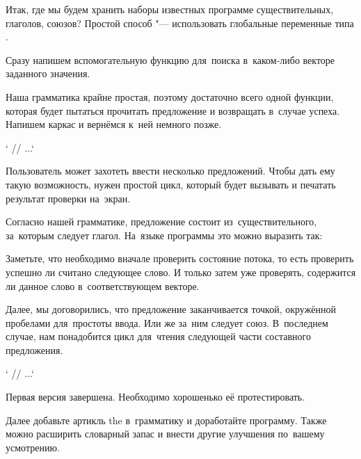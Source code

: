 Итак, где мы будем хранить наборы известных программе существительных, глаголов, союзов? Простой способ "--- использовать глобальные переменные типа .


Сразу напишем вспомогательную функцию для~поиска в~каком-либо векторе заданного значения.


Наша грамматика крайне простая, поэтому достаточно всего одной функции, которая будет пытаться прочитать предложение и возвращать  в~случае успеха. Напишем каркас и вернёмся к~ней немного позже.

\cpp`  // ...`

Пользователь может захотеть ввести несколько предложений. Чтобы дать ему такую возможность, нужен простой цикл, который будет вызывать  и печатать результат проверки на~экран.


Согласно нашей грамматике, предложение состоит из~существительного, за~которым следует глагол. На~языке программы это можно выразить так:


Заметьте, что необходимо вначале проверить состояние потока, то есть проверить успешно ли считано следующее слово. И только затем уже проверять, содержится ли данное слово в~соответствующем векторе.

Далее, мы договорились, что предложение заканчивается точкой, окружённой пробелами для~простоты ввода. Или же за~ним следует союз. В~последнем случае, нам понадобится цикл для~чтения следующей части составного предложения.

\cpp`    // ...`

Первая версия завершена. Необходимо хорошенько её протестировать.

Далее добавьте артикль \textenglish{the} в~грамматику и доработайте программу. Также можно расширить словарный запас и внести другие улучшения по~вашему усмотрению.




